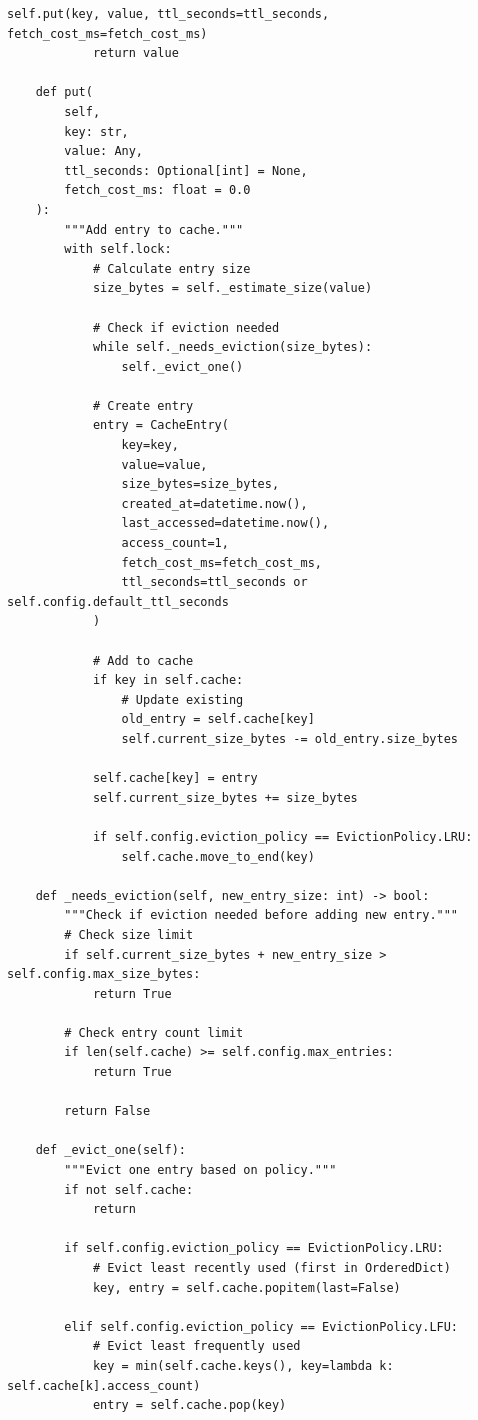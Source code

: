 \begin{lstlisting}[style=python, caption={Cache Manager with Intelligent Eviction}]
            self.put(key, value, ttl_seconds=ttl_seconds, fetch_cost_ms=fetch_cost_ms)
            return value

    def put(
        self,
        key: str,
        value: Any,
        ttl_seconds: Optional[int] = None,
        fetch_cost_ms: float = 0.0
    ):
        """Add entry to cache."""
        with self.lock:
            # Calculate entry size
            size_bytes = self._estimate_size(value)

            # Check if eviction needed
            while self._needs_eviction(size_bytes):
                self._evict_one()

            # Create entry
            entry = CacheEntry(
                key=key,
                value=value,
                size_bytes=size_bytes,
                created_at=datetime.now(),
                last_accessed=datetime.now(),
                access_count=1,
                fetch_cost_ms=fetch_cost_ms,
                ttl_seconds=ttl_seconds or self.config.default_ttl_seconds
            )

            # Add to cache
            if key in self.cache:
                # Update existing
                old_entry = self.cache[key]
                self.current_size_bytes -= old_entry.size_bytes

            self.cache[key] = entry
            self.current_size_bytes += size_bytes

            if self.config.eviction_policy == EvictionPolicy.LRU:
                self.cache.move_to_end(key)

    def _needs_eviction(self, new_entry_size: int) -> bool:
        """Check if eviction needed before adding new entry."""
        # Check size limit
        if self.current_size_bytes + new_entry_size > self.config.max_size_bytes:
            return True

        # Check entry count limit
        if len(self.cache) >= self.config.max_entries:
            return True

        return False

    def _evict_one(self):
        """Evict one entry based on policy."""
        if not self.cache:
            return

        if self.config.eviction_policy == EvictionPolicy.LRU:
            # Evict least recently used (first in OrderedDict)
            key, entry = self.cache.popitem(last=False)

        elif self.config.eviction_policy == EvictionPolicy.LFU:
            # Evict least frequently used
            key = min(self.cache.keys(), key=lambda k: self.cache[k].access_count)
            entry = self.cache.pop(key)


\end{lstlisting}
